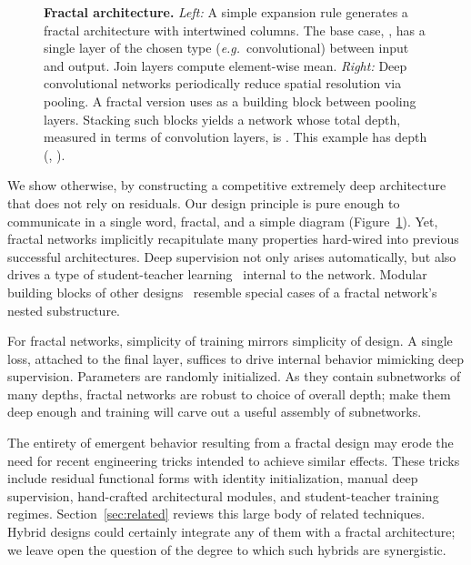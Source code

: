 \documentclass{article}
\def\eg{\emph{e.g.}}
\begin{document}
\begin{figure}[ht]
   \begin{center}
      
   \end{center}
   \vspace{-0.02\linewidth}
   \caption{
      \textbf{Fractal architecture.}
      \emph{Left:}
         A simple expansion rule generates a fractal architecture with 
         intertwined columns.  The base case, , has a single layer
         of the chosen type (\eg~convolutional) between input and output.
         Join layers compute element-wise mean.
      \emph{Right:}
         Deep convolutional networks periodically reduce spatial resolution
         via pooling.  A fractal version uses  as a building block
         between pooling layers.  Stacking  such blocks yields a network
         whose total depth, measured in terms of convolution layers, is
         .  This example has depth  (, ).
   }
   \label{fig:fractalnet}
\end{figure}

We show otherwise, by constructing a competitive extremely deep architecture
that does not rely on residuals.  Our design principle is pure enough to
communicate in a single word, fractal, and a simple diagram
(Figure~\ref{fig:fractalnet}).  Yet, fractal networks implicitly recapitulate
many properties hard-wired into previous successful architectures.  Deep
supervision not only arises automatically, but also drives a type of
student-teacher learning~\citep{ba2014dodeep,urban2016dodeepsfollowup} internal
to the network.  Modular building blocks of other designs~\citep{
szegedy2015inception,liao2015competitive} resemble special cases of a fractal
network's nested substructure.

For fractal networks, simplicity of training mirrors simplicity of design.
A single loss, attached to the final layer, suffices to drive internal
behavior mimicking deep supervision.  Parameters are randomly initialized.
As they contain subnetworks of many depths, fractal networks are robust to
choice of overall depth; make them deep enough and training will carve out a
useful assembly of subnetworks.

The entirety of emergent behavior resulting from a fractal design may erode
the need for recent engineering tricks intended to achieve similar effects.
These tricks include residual functional forms with identity initialization,
manual deep supervision, hand-crafted architectural modules, and
student-teacher training regimes.  Section~\ref{sec:related} reviews this
large body of related techniques.  Hybrid designs could certainly integrate
any of them with a fractal architecture; we leave open the question of the
degree to which such hybrids are synergistic.
\end{document}
